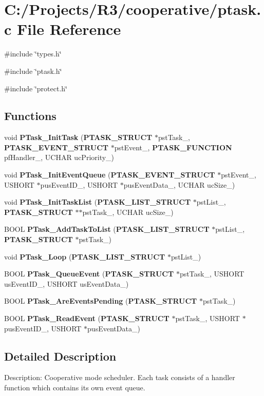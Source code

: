 \section{C:/Projects/R3/cooperative/ptask.c File Reference}
\label{ptask_8c}
{\ttfamily \#include \char`\"{}types.h\char`\"{}}\par
{\ttfamily \#include \char`\"{}ptask.h\char`\"{}}\par
{\ttfamily \#include \char`\"{}protect.h\char`\"{}}\par
\subsection*{Functions}
\begin{DoxyCompactItemize}
\item 
void {\bf PTask\_\-InitTask} ({\bf PTASK\_\-STRUCT} $\ast$pstTask\_\-, {\bf PTASK\_\-EVENT\_\-STRUCT} $\ast$pstEvent\_\-, {\bf PTASK\_\-FUNCTION} pfHandler\_\-, UCHAR ucPriority\_\-)
\item 
void {\bf PTask\_\-InitEventQueue} ({\bf PTASK\_\-EVENT\_\-STRUCT} $\ast$pstEvent\_\-, USHORT $\ast$pusEventID\_\-, USHORT $\ast$pusEventData\_\-, UCHAR ucSize\_\-)
\item 
void {\bf PTask\_\-InitTaskList} ({\bf PTASK\_\-LIST\_\-STRUCT} $\ast$pstList\_\-, {\bf PTASK\_\-STRUCT} $\ast$$\ast$pstTask\_\-, UCHAR ucSize\_\-)
\item 
BOOL {\bf PTask\_\-AddTaskToList} ({\bf PTASK\_\-LIST\_\-STRUCT} $\ast$pstList\_\-, {\bf PTASK\_\-STRUCT} $\ast$pstTask\_\-)
\item 
void {\bf PTask\_\-Loop} ({\bf PTASK\_\-LIST\_\-STRUCT} $\ast$pstList\_\-)
\item 
BOOL {\bf PTask\_\-QueueEvent} ({\bf PTASK\_\-STRUCT} $\ast$pstTask\_\-, USHORT usEventID\_\-, USHORT usEventData\_\-)
\item 
BOOL {\bf PTask\_\-AreEventsPending} ({\bf PTASK\_\-STRUCT} $\ast$pstTask\_\-)
\item 
BOOL {\bf PTask\_\-ReadEvent} ({\bf PTASK\_\-STRUCT} $\ast$pstTask\_\-, USHORT $\ast$pusEventID\_\-, USHORT $\ast$pusEventData\_\-)
\end{DoxyCompactItemize}


\subsection{Detailed Description}
Description: Cooperative mode scheduler. Each task consists of a handler function which contains its own event queue.

